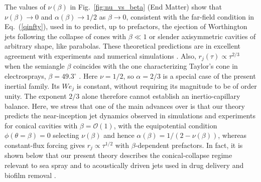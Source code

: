 \documentclass[aps,prl,reprint,floatfix]{revtex4-2}
\begin{document}
The values of $\nu(\beta)$ in Fig.~\ref{fig:nu_vs_beta} (End Matter) show that $\nu(\beta)\rightarrow 0$ and $\alpha(\beta)\to1/2$ as $\beta\rightarrow0$, consistent with the far-field condition in Eq.~(\ref{qinfty}), used in \cite{PRF2023} to predict, up to prefactors, the ejection of Worthington jets following the collapse of cones with $\beta\ll 1$ or slender axisymmetric cavities of arbitrary shape, like parabolas. These theoretical predictions are in excellent agreement with experiments and numerical simulations \cite{PRL2024}. Also, $r_j(\tau)\propto \tau^{2/3}$ when the semiangle $\beta$ coincides with the one characterizing Taylor's cone in electrosprays, $\beta=49.3^\circ$ \cite{Taylor}. Here $\nu=1/2$, so $\alpha=2/3$ is a special case of the present inertial family. Its $We_j$ is constant, without requiring its magnitude to be of order unity. The exponent $2/3$ alone therefore cannot establish an inertio-capillary balance. Here, we stress that one of the main advances over \cite{PRF2023} is that our theory predicts the near-inception jet dynamics observed in simulations and experiments for conical cavities with $\beta=\mathcal{O}(1)$, with the equipotential condition $\phi(\theta=\beta)=0$ selecting $\nu(\beta)$ and hence $\alpha(\beta)=1/(2-\nu(\beta))$, whereas constant-flux forcing gives $r_j\propto\tau^{1/2}$ with $\beta$-dependent prefactors. In fact, it is shown below that our present theory describes the conical-collapse regime relevant to sea spray \cite{AnnRevDeike} and to acoustically driven jets used in drug delivery and biofilm removal \cite{NatPhysCatt,PRLCattaneo}.
\end{document}
